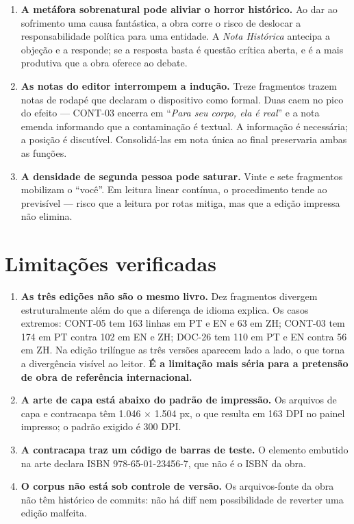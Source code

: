 \documentclass[11pt,a4paper]{article}
\begin{document}
\begin{enumerate}
\item \textbf{A metáfora sobrenatural pode aliviar o horror histórico.} Ao
dar ao sofrimento uma causa fantástica, a obra corre o risco de deslocar a
responsabilidade política para uma entidade. A \textit{Nota Histórica}
antecipa a objeção e a responde; se a resposta basta é questão crítica aberta,
e é a mais produtiva que a obra oferece ao debate.

\item \textbf{As notas do editor interrompem a indução.} Treze fragmentos
trazem notas de rodapé que declaram o dispositivo como formal. Duas caem no
pico do efeito --- CONT-03 encerra em ``\textit{Para seu corpo, ela é real}'' e
a nota emenda informando que a contaminação é textual. A informação é
necessária; a posição é discutível. Consolidá-las em nota única ao final
preservaria ambas as funções.

\item \textbf{A densidade de segunda pessoa pode saturar.} Vinte e sete
fragmentos mobilizam o ``você''. Em leitura linear contínua, o procedimento
tende ao previsível --- risco que a leitura por rotas mitiga, mas que a
edição impressa não elimina.
\end{enumerate}

\section{Limitações verificadas}
\label{sec:limites}

\begin{enumerate}
\item \textbf{As três edições não são o mesmo livro.} Dez fragmentos divergem
estruturalmente além do que a diferença de idioma explica. Os casos extremos:
CONT-05 tem 163 linhas em PT e EN e 63 em ZH; CONT-03 tem 174 em PT contra 102
em EN e ZH; DOC-26 tem 110 em PT e EN contra 56 em ZH. Na edição trilíngue as
três versões aparecem lado a lado, o que torna a divergência visível ao
leitor. \textbf{É a limitação mais séria para a pretensão de obra de
referência internacional.}

\item \textbf{A arte de capa está abaixo do padrão de impressão.} Os arquivos
de capa e contracapa têm 1.046 $\times$ 1.504 px, o que resulta em 163 DPI no
painel impresso; o padrão exigido é 300 DPI.

\item \textbf{A contracapa traz um código de barras de teste.} O elemento
embutido na arte declara ISBN 978-65-01-23456-7, que não é o ISBN da obra.

\item \textbf{O corpus não está sob controle de versão.} Os arquivos-fonte da
obra não têm histórico de commits: não há diff nem possibilidade de reverter
uma edição malfeita.
\end{enumerate}
\end{document}
